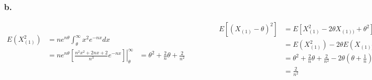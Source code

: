 \documentclass{article}
\begin{document}
\subsubsection*{b.}
\begin{equation*}
\begin{aligned}
E\left(X_{(1)}^2\right) &= ne^{n\theta}\int_\theta^\infty x^2e^{-nx}dx \\
&=ne^{n\theta}\left.\left[\frac{n^2x^2+2nx+2}{n^3}e^{-nx}\right]\right|^\infty_\theta
&= \theta^2+\frac{2}{n}\theta+\frac{2}{n^2}
\end{aligned}
\qquad\qquad
\begin{aligned}
E\left[(X_{(1)} - \theta)^2\right] &= E\left[X_{(1)}^2 - 2\theta X_{(1))} + \theta^2\right] \\
&= E\left(X_{(1)}^2\right) - 2\theta E(X_{(1))})+\theta^2 \\
&=\theta^2+\frac{2}{n}\theta+\frac{2}{n^2} - 2\theta\left(\theta + \frac{1}{n}\right) + \theta^2 \\
&= \frac{2}{n^2}
\end{aligned}
\end{equation*}
\end{document}
